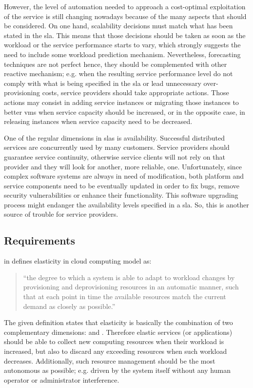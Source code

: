 However, the level of automation needed to approach a cost-optimal exploitation of the service is still
changing nowadays because of the many aspects that should be considered. On one hand, scalability
decisions must match what has been stated in the \ac{sla}. This means that those decisions should be
taken as soon as the workload or the service performance starts to vary, which strongly suggests the
need to include some workload prediction mechanism. Nevertheless, forecasting techniques are not perfect
hence, they should be complemented with other reactive mechanism; e.g. when the resulting service
performance level do not comply with what is being specified in the \ac{sla} or lead unnecessary
over-provisioning costs, service providers should take appropriate actions. Those actions may consist
in adding service instances or migrating those instances to better \ac{vm}s when service capacity
should be increased, or in the opposite case, in releasing instances when service capacity need to be
decreased.

One of the regular dimensions in \ac{sla}s is availability. Successful distributed services are
concurrently used by many customers. Service providers should guarantee service continuity, otherwise
service clients will not rely on that provider and they will look for another, more reliable, one.
Unfortunately, since complex software systems are always in need of modification, both platform and
service components need to be eventually updated in order to fix bugs, remove security vulnerabilities
or enhance their functionality. This software upgrading process might endanger the availability levels
specified in a \ac{sla}. So, this is another source of trouble for service providers.

\subsection{Requirements}
\label{sec:elasticity-requirements}
\citeauthor{herbst2013elasticity} in \cite{herbst2013elasticity} defines elasticity in cloud computing
model as:

\begin{quote}
	``the degree to which a system is able to adapt to workload changes by provisioning and
	deprovisioning resources in an automatic manner, such that at each point in time the available resources
	match the current demand as closely as possible.''
\end{quote}

The given definition states that elasticity is basically the combination of two complementary
dimensions:  and . Therefore elastic services (or applications)
should be able to collect new computing resources when their workload is increased, but also to discard
any exceeding resources when such workload decreases. Additionally, such resource management should be
the most autonomous as possible; e.g. driven by the system itself without any human operator or
administrator interference.

